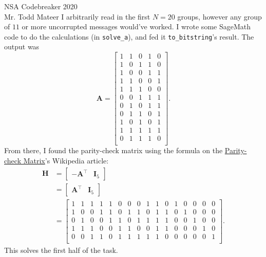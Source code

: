 \documentclass{letter}
\begin{document}
\begin{letter}{NSA Codebreaker 2020\\Mr. Todd Mateer}
I arbitrarily read in the first \(N=20\) groups, however any group of \(11\) or
more uncorrupted messages would've worked. I wrote some SageMath code to do the
calculations (in \texttt{solve\_a}), and fed it \texttt{to\_bitstring}'s result.
The output was
\[ \mathbf{A} = \begin{bmatrix}
    1 & 1 & 0 & 1 & 0 \\
    1 & 0 & 1 & 1 & 0 \\
    1 & 0 & 0 & 1 & 1 \\
    1 & 1 & 0 & 0 & 1 \\
    1 & 1 & 1 & 0 & 0 \\
    0 & 0 & 1 & 1 & 1 \\
    0 & 1 & 0 & 1 & 1 \\
    0 & 1 & 1 & 0 & 1 \\
    1 & 0 & 1 & 0 & 1 \\
    1 & 1 & 1 & 1 & 1 \\
    0 & 1 & 1 & 1 & 0 \\
\end{bmatrix}. \]
From there, I found the parity-check matrix using the formula on the
\href{https://en.wikipedia.org/wiki/Parity-check_matrix}{Parity-check Matrix}'s
Wikipedia article:
\begin{align*}
    \mathbf{H} &= \begin{bmatrix} -\mathbf{A}^\top & \mathbf{I}_5 \end{bmatrix} \\
        &= \begin{bmatrix} \mathbf{A}^\top & \mathbf{I}_5 \end{bmatrix} \\
        &= \begin{bmatrix}
            1 & 1 & 1 & 1 & 1 & 0 & 0 & 0 & 1 & 1 & 0 & 1 & 0 & 0 & 0 & 0 \\
            1 & 0 & 0 & 1 & 1 & 0 & 1 & 1 & 0 & 1 & 1 & 0 & 1 & 0 & 0 & 0 \\
            0 & 1 & 0 & 0 & 1 & 1 & 0 & 1 & 1 & 1 & 1 & 0 & 0 & 1 & 0 & 0 \\
            1 & 1 & 1 & 0 & 0 & 1 & 1 & 0 & 0 & 1 & 1 & 0 & 0 & 0 & 1 & 0 \\
            0 & 0 & 1 & 1 & 0 & 1 & 1 & 1 & 1 & 1 & 0 & 0 & 0 & 0 & 0 & 1 \\
        \end{bmatrix}.
\end{align*}
This solves the first half of the task.



\end{letter}
\end{document}
